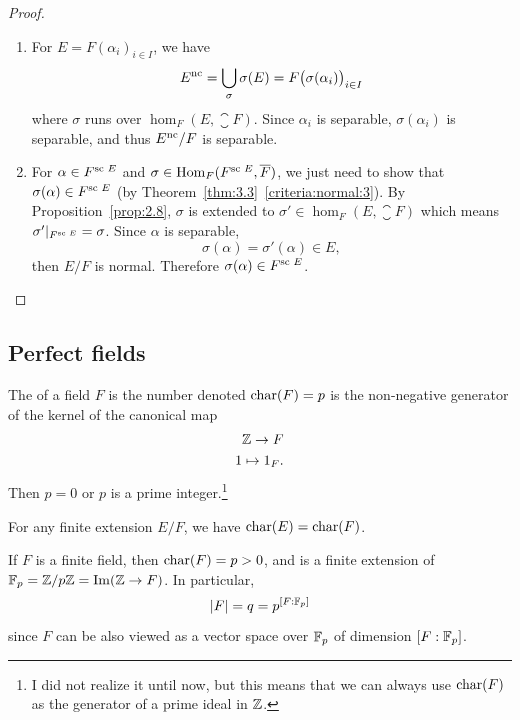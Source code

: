 \begin{proof}
\begin{enumerate}
\item For $E=F(\alpha_{i})_{i\in I}$, we have
\begin{equation}
E^{\text{nc}}=\bigcup_{\sigma}\sigma(E)=F\bigl(\sigma(\alpha_{i})\bigr)_{i\in I}
\end{equation}
where $\sigma$ runs over $\hom_{F}(E,\closure{F})$. Since $\alpha_{i}$
is separable, $\sigma(\alpha_{i})$ is separable, and thus
$E^{\text{nc}}/F$ is separable.
\item For $\alpha\in\separableclosure{F}{E}$ and $\sigma\in\hom_{F}(\separableclosure{F}{E},\closure{F})$,
we just need to show that $\sigma(\alpha)\in\separableclosure{F}{E}$
(by Theorem~\ref{thm:3.3}~\ref{criteria:normal:3}). By
Proposition~\ref{prop:2.8}, $\sigma$ is extended to
$\sigma'\in\hom_{F}(E,\closure{F})$ which means
$\sigma'|_{\separableclosure{F}{E}}=\sigma$. Since $\alpha$ is
separable,
\begin{equation}
\sigma(\alpha)=\sigma'(\alpha)\in E,
\end{equation}
then $E/F$ is normal. Therefore $\sigma(\alpha)\in\separableclosure{F}{E}$.\qedhere
\end{enumerate}
\end{proof}

\subsection{Perfect fields}

\begin{definition}
The  of a field $F$ is the number denoted
$\operatorname{char}(F)=p$ is the non-negative generator of the kernel of the
canonical map
\begin{equation}
\begin{split}
\mathbb{Z}\to F\\
1\mapsto 1_{F}.
\end{split}
\end{equation}
Then $p=0$ or $p$ is a prime integer.\footnote{I did not realize it
until now, but this means that we can always use $\operatorname{char}(F)$ as the
generator of a prime ideal in $\mathbb{Z}$.}
\end{definition}

\begin{node}
For any finite extension $E/F$, we have $\operatorname{char}(E)=\operatorname{char}(F)$.
\end{node}

\begin{node}
If $F$ is a finite field, then $\operatorname{char}(F)=p>0$, and is a finite
extension of $\mathbb{F}_{p}=\mathbb{Z}/p\mathbb{Z}=\operatorname{Im}(\mathbb{Z}\to F)$. In particular,
\begin{equation}
|F|=q=p^{[F:\mathbb{F}_{p}]}
\end{equation}
since $F$ can be also viewed as a vector space over $\mathbb{F}_{p}$ of
dimension $[F:\mathbb{F}_{p}]$.
\end{node}

